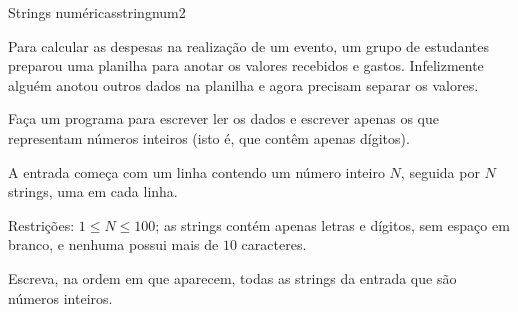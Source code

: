 \documentclass[12pt,a4paper,oneside]{article}
\begin{document}
\begin{problem}{Strings numéricas}{stringnum}{2}

\begingroup
\setlength{\intextsep}{0pt}%

Para calcular as despesas na realização de um evento, um grupo de estudantes preparou uma planilha para anotar os valores recebidos e gastos. Infelizmente alguém anotou outros dados na planilha e agora precisam separar os valores.

Faça um programa para escrever ler os dados e escrever apenas os que representam números inteiros (isto é, que contêm apenas dígitos).


\InputFile

A entrada começa com um linha contendo um número inteiro $N$, seguida por $N$ strings, uma em cada linha.

Restrições: $1 \leq N \leq 100$; as strings contém apenas letras e dígitos, sem espaço em branco, e nenhuma possui mais de $10$ caracteres.

\endgroup

\OutputFile

Escreva, na ordem em que aparecem, todas as strings da entrada que são números inteiros.


\Example

\begin{example}
%
\end{example}

\begin{example}
%
\end{example}

\begin{example}
%
\end{example}


\end{problem}
\end{document}
